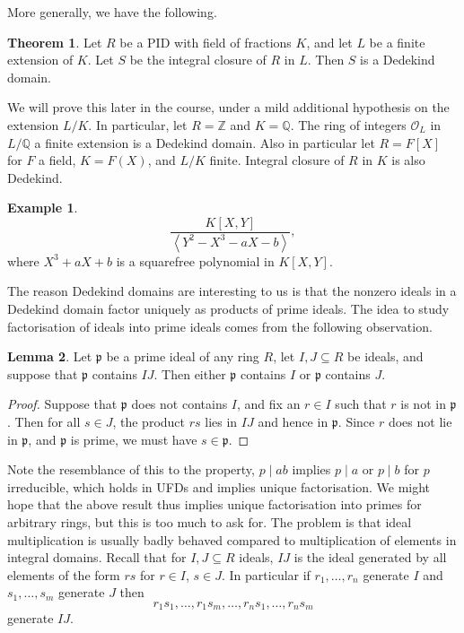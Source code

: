 \documentclass{article}
\newcommand{\Z}{\mathbb{Z}}
\newcommand{\Q}{\mathbb{Q}}
\newcommand{\rb}[1]{\left( #1 \right)}
\renewcommand{\sb}[1]{\left[ #1 \right]}
\newcommand{\ab}[1]{\left\langle #1 \right\rangle}
\theoremstyle{definition}\newtheorem{definition}{Definition}[subsection]
\theoremstyle{definition}\newtheorem{remark}[definition]{Remark}
\theoremstyle{definition}\newtheorem*{example}{Example}
\theoremstyle{definition}\newtheorem*{note}{Note}
\newtheorem{lemma}[definition]{Lemma}
\newtheorem{theorem}[definition]{Theorem}
\begin{document}
More generally, we have the following.

\begin{theorem}
Let $ R $ be a PID with field of fractions $ K $, and let $ L $ be a finite extension of $ K $. Let $ S $ be the integral closure of $ R $ in $ L $. Then $ S $ is a Dedekind domain.
\end{theorem}

We will prove this later in the course, under a mild additional hypothesis on the extension $ L / K $. In particular, let $ R = \Z $ and $ K = \Q $. The ring of integers $ \mathcal{O}_L $ in $ L / \Q $ a finite extension is a Dedekind domain. Also in particular let $ R = F\sb{X} $ for $ F $ a field, $ K = F\rb{X} $, and $ L / K $ finite. Integral closure of $ R $ in $ K $ is also Dedekind.

\begin{example}
$$ \dfrac{K\sb{X, Y}}{\ab{Y^2 - X^3 - aX - b}}, $$
where $ X^3 + aX + b $ is a squarefree polynomial in $ K\sb{X, Y} $.
\end{example}

The reason Dedekind domains are interesting to us is that the nonzero ideals in a Dedekind domain factor uniquely as products of prime ideals. The idea to study factorisation of ideals into prime ideals comes from the following observation.

\begin{lemma}
\label{lem:11.1.3}
Let $ \mathfrak{p} $ be a prime ideal of any ring $ R $, let $ I, J \subseteq R $ be ideals, and suppose that $ \mathfrak{p} $ contains $ IJ $. Then either $ \mathfrak{p} $ contains $ I $ or $ \mathfrak{p} $ contains $ J $.
\end{lemma}

\begin{proof}
Suppose that $ \mathfrak{p} $ does not contains $ I $, and fix an $ r \in I $ such that $ r $ is not in $ \mathfrak{p} $. Then for all $ s \in J $, the product $ rs $ lies in $ IJ $ and hence in $ \mathfrak{p} $. Since $ r $ does not lie in $ \mathfrak{p} $, and $ \mathfrak{p} $ is prime, we must have $ s \in \mathfrak{p} $.
\end{proof}

Note the resemblance of this to the property, $ p \mid ab $ implies $ p \mid a $ or $ p \mid b $ for $ p $ irreducible, which holds in UFDs and implies unique factorisation. We might hope that the above result thus implies unique factorisation into primes for arbitrary rings, but this is too much to ask for. The problem is that ideal multiplication is usually badly behaved compared to multiplication of elements in integral domains. Recall that for $ I, J \subseteq R $ ideals, $ IJ $ is the ideal generated by all elements of the form $ rs $ for $ r \in I $, $ s \in J $. In particular if $ r_1, \dots, r_n $ generate $ I $ and $ s_1, \dots, s_m $ generate $ J $ then
$$ r_1s_1, \dots, r_1s_m, \dots, r_ns_1, \dots, r_ns_m $$
generate $ IJ $.
\end{document}
